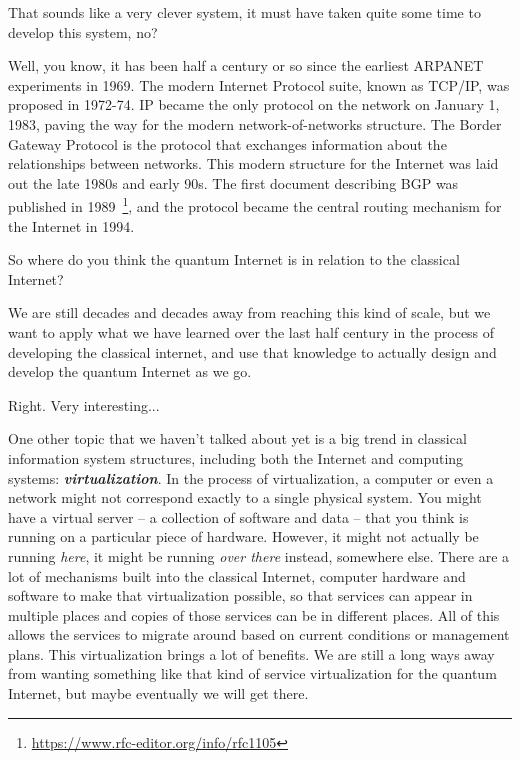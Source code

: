 \mmm That sounds like a very clever system, it must have taken quite some time to develop this system, no?

\rrr Well, you know, it has been half a century or so since the earliest ARPANET experiments in 1969.  
The modern Internet Protocol suite, known as TCP/IP, was proposed in 1972-74. IP became the only protocol on the network on January 1, 1983, paving the way for the modern network-of-networks structure. 
The Border Gateway Protocol is the protocol that exchanges information about the relationships between networks. This modern structure for the Internet was laid out the late 1980s and early 90s. The first document describing BGP was published in 1989~\footnote{\url{https://www.rfc-editor.org/info/rfc1105}}, and the protocol became the central routing mechanism for the Internet in 1994.

\mmm So where do you think the quantum Internet is in relation to the classical Internet?

\rrr We are still decades and decades away from reaching this kind of scale, but we want to apply what we have learned over the last half century in the process of developing the classical internet, and use that knowledge to actually design and develop the quantum Internet as we go.

\mmm Right. Very interesting...

\rrr One other topic that we haven't talked about yet is a big trend in classical information system structures, including both the Internet and computing systems: \textbf{\emph{virtualization}}. In the process of virtualization, a computer or even a network might not correspond exactly to a single physical system. You might have a virtual server -- a collection of software and data -- that you think is running on a particular piece of hardware.  However, it might not actually be running \emph{here}, it might be running \emph{over there} instead, somewhere else. There are a lot of mechanisms built into the classical Internet, computer hardware and software to make that virtualization possible, so that services can appear in multiple places and copies of those services can be in different places. All of this allows the services to migrate around based on current conditions or management plans. This virtualization brings a lot of benefits. We are still a long ways away from wanting something like that kind of service virtualization for the quantum Internet, but maybe eventually we will get there.

